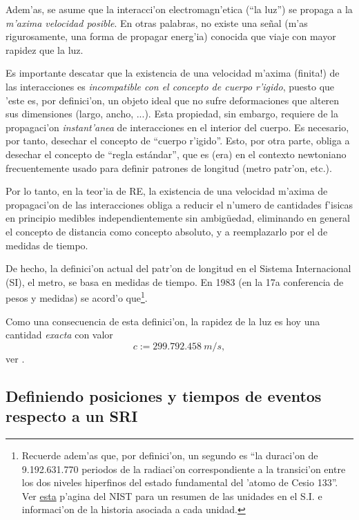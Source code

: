 Adem'as, se asume que la interacci'on electromagn'etica (``la luz'') se propaga a la \textit{m'axima velocidad posible}. En otras palabras, no existe una se\~nal (m'as rigurosamente, una forma de propagar energ'ia) conocida que viaje con mayor rapidez que la luz.

Es importante descatar que la existencia de una velocidad m'axima (finita!) de las interacciones es \textit{incompatible con el concepto de
cuerpo r'igido}, puesto que 'este es, por definici'on, un objeto ideal
que no sufre deformaciones que alteren sus dimensiones (largo, ancho, ...).
Esta propiedad, sin embargo, requiere de la propagaci'on \textit{instant'anea} de interacciones en el interior del cuerpo. Es necesario, por tanto, desechar el concepto de ``cuerpo
r'igido''. Esto, por otra parte, obliga a desechar el concepto de ``regla
est\'andar'', que es (era) en el contexto newtoniano frecuentemente usado para definir patrones de longitud (metro patr'on, etc.).

Por lo tanto, en la teor'ia de RE, la existencia de una velocidad m'axima de propagaci'on de las interacciones obliga a reducir el n'umero de cantidades f'isicas en principio medibles independientemente sin ambig\"uedad, eliminando en general el concepto de distancia como concepto absoluto, y a reemplazarlo por el de medidas de tiempo.

De hecho, la definici'on actual del patr'on de longitud en el Sistema
Internacional (SI), el metro, se basa en medidas de tiempo. En 1983 (en la 17a
conferencia de pesos y medidas) se acord'o que\footnote{Recuerde adem'as que, por definici'on, un segundo es ``la duraci'on de 9.192.631.770 periodos de la radiaci'on correspondiente a la transici'on entre los dos niveles hiperfinos del estado fundamental del 'atomo de Cesio 133''. Ver \href{http://physics.nist.gov/cuu/Units/current.html}{esta} p'agina del NIST para un resumen de las unidades en el S.I. e informaci'on de la historia asociada a cada unidad.}.
\begin{quotation}
\end{quotation}
Como una consecuencia de esta definici'on, la rapidez de la luz es hoy una
cantidad \textit{exacta} con valor
\begin{equation}
\boxed{c:=299.792.458\ m/s,}
\end{equation}
ver \cite{CODATA00}.

\subsection{Definiendo posiciones y tiempos de eventos respecto a un SRI}

